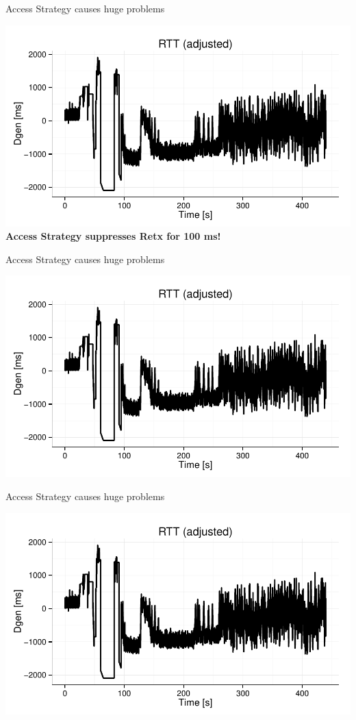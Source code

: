 \begin{frame}{Access Strategy causes huge problems}
	
	\includegraphics[width=\linewidth,page=2]{images/test8_5.pdf}
	\textbf{
	Access Strategy suppresses Retx for 100 ms!}
	
\end{frame}


\begin{frame}{Access Strategy causes huge problems}
	
	\includegraphics[width=\linewidth,page=8]{images/test8_5.pdf}
	
\end{frame}


\begin{frame}{Access Strategy causes huge problems}
	
	\includegraphics[width=\linewidth,page=6]{images/test8_5.pdf}
	
\end{frame}


